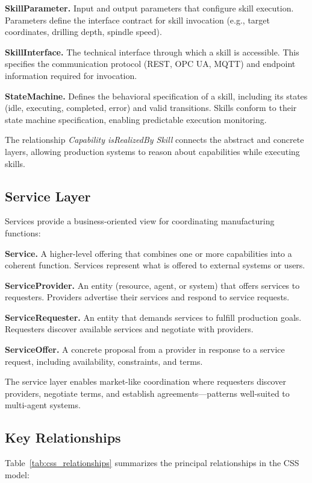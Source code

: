 \textbf{SkillParameter.} Input and output parameters that configure skill execution. Parameters define the interface contract for skill invocation (e.g., target coordinates, drilling depth, spindle speed).

\textbf{SkillInterface.} The technical interface through which a skill is accessible. This specifies the communication protocol (REST, OPC UA, MQTT) and endpoint information required for invocation.

\textbf{StateMachine.} Defines the behavioral specification of a skill, including its states (idle, executing, completed, error) and valid transitions. Skills conform to their state machine specification, enabling predictable execution monitoring.

The relationship \textit{Capability isRealizedBy Skill} connects the abstract and concrete layers, allowing production systems to reason about capabilities while executing skills.
\subsection{Service Layer}

Services provide a business-oriented view for coordinating manufacturing functions:

\textbf{Service.} A higher-level offering that combines one or more capabilities into a coherent function. Services represent what is offered to external systems or users.

\textbf{ServiceProvider.} An entity (resource, agent, or system) that offers services to requesters. Providers advertise their services and respond to service requests.

\textbf{ServiceRequester.} An entity that demands services to fulfill production goals. Requesters discover available services and negotiate with providers.

\textbf{ServiceOffer.} A concrete proposal from a provider in response to a service request, including availability, constraints, and terms.

The service layer enables market-like coordination where requesters discover providers, negotiate terms, and establish agreements---patterns well-suited to multi-agent systems.
\subsection{Key Relationships}

Table~\ref{tab:css_relationships} summarizes the principal relationships in the CSS model:

